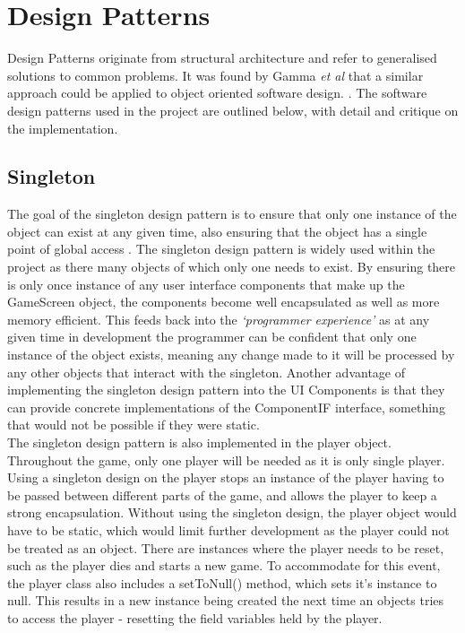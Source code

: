 \documentclass[a4paper,12pt]{article}
\begin{document}
\section*{Design Patterns}
Design Patterns originate from structural architecture and refer to generalised solutions to common problems. It was found by Gamma \textit{et al} that a similar approach could be applied to object oriented software design. \cite{GoF-Book}. The software design patterns used in the project are outlined below, with detail and critique on the implementation.

\subsection*{Singleton}
The goal of the singleton design pattern is to ensure that only one instance of the object can exist at any given time, also ensuring that the object has a single point of global access \cite{GoF-Book}. The singleton design pattern is widely used within the project as there many objects of which only one needs to exist. By ensuring there is only once instance of any user interface components that make up the GameScreen object, the components become well encapsulated as well as more memory efficient. This feeds back into the \textit{`programmer experience'} as at any given time in development the programmer can be confident that only one instance of the object exists, meaning any change made to it will be processed by any other objects that interact with the singleton. Another advantage of implementing the singleton design pattern into the UI Components is that they can provide concrete implementations of the ComponentIF interface, something that would not be possible if they were static. 
\\
The singleton design pattern is also implemented in the player object. Throughout the game, only one player will be needed as it is only single player. Using a singleton design on the player stops an instance of the player having to be passed between different parts of the game, and allows the player to keep a strong encapsulation. Without using the singleton design, the player object would have to be static, which would limit further development as the player could not be treated as an object. There are instances where the player needs to be reset, such as the player dies and starts a new game. To accommodate for this event, the player class also includes a setToNull() method, which sets it's instance to null. This results in a new instance being created the next time an objects tries to access the player - resetting the field variables held by the player. 
\end{document}
